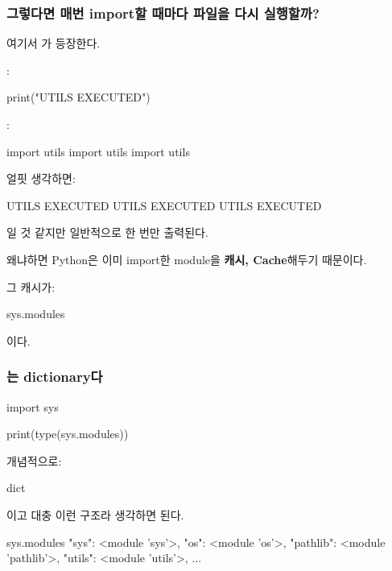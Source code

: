 \subsubsection{그렇다면 매번 import할 때마다 파일을 다시 실행할까?}

여기서 가 등장한다.

:

\begin{dhkcode}
print("UTILS EXECUTED")
\end{dhkcode}

:

\begin{dhkcode}
import utils
import utils
import utils
\end{dhkcode}

얼핏 생각하면:

\begin{dhkzsh}
UTILS EXECUTED
UTILS EXECUTED
UTILS EXECUTED
\end{dhkzsh}

일 것 같지만 일반적으로 한 번만 출력된다.

왜냐하면 Python은 이미 import한 module을 \textbf{캐시, Cache}해두기 때문이다.

그 캐시가:

\begin{dhksmry}[centered]
sys.modules
\end{dhksmry}

이다.

\subsubsection{는 dictionary다}

\begin{dhkcode}
import sys

print(type(sys.modules))
\end{dhkcode}

개념적으로:

\begin{dhkzsh}
dict
\end{dhkzsh}

이고 대충 이런 구조라 생각하면 된다.

\begin{dhkzsh}
sys.modules
{
    "sys": <module 'sys'>,
    "os": <module 'os'>,
    "pathlib": <module 'pathlib'>,
    "utils": <module 'utils'>,
    ...
}
\end{dhkzsh}

